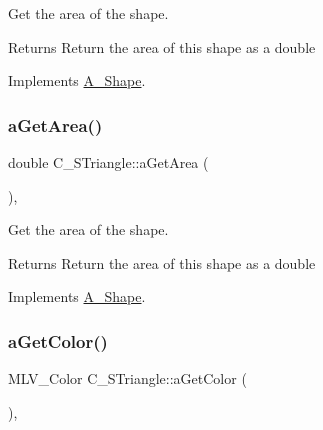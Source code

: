 Get the area of the shape. 

\begin{DoxyReturn}{Returns}
Return the area of this shape as a double 
\end{DoxyReturn}


Implements \hyperlink{classA__Shape_a1b142ee2d873d6c217f65de1632e7b6e}{A\+\_\+\+Shape}.

\mbox{\label{classC__STriangle_aaff25f3c7f7640c3e7c735a77800e96e}} 
\subsubsection{\texorpdfstring{a\+Get\+Area()}{aGetArea()}\hspace{0.1cm}{\footnotesize\ttfamily [2/2]}}
{\footnotesize\ttfamily double C\+\_\+\+S\+Triangle\+::a\+Get\+Area (\begin{DoxyParamCaption}{ }\end{DoxyParamCaption})\hspace{0.3cm}{\ttfamily [override]}, {\ttfamily [virtual]}}



Get the area of the shape. 

\begin{DoxyReturn}{Returns}
Return the area of this shape as a double 
\end{DoxyReturn}


Implements \hyperlink{classA__Shape_a1b142ee2d873d6c217f65de1632e7b6e}{A\+\_\+\+Shape}.

\mbox{\label{classC__STriangle_a1a0c315653ece65118705648d09336dd}} 
\subsubsection{\texorpdfstring{a\+Get\+Color()}{aGetColor()}\hspace{0.1cm}{\footnotesize\ttfamily [1/2]}}
{\footnotesize\ttfamily M\+L\+V\+\_\+\+Color C\+\_\+\+S\+Triangle\+::a\+Get\+Color (\begin{DoxyParamCaption}{ }\end{DoxyParamCaption})\hspace{0.3cm}{\ttfamily [override]}, {\ttfamily [virtual]}}



